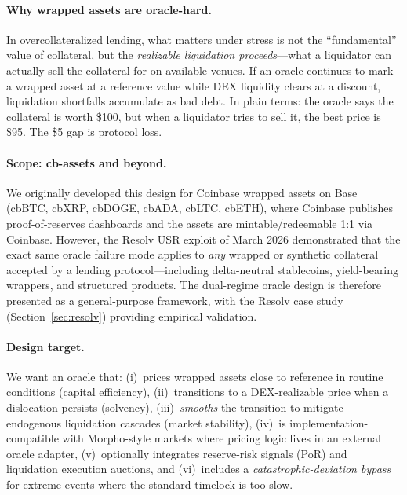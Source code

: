 \documentclass[11pt]{article}
\begin{document}
\paragraph{Why wrapped assets are oracle-hard.}
In overcollateralized lending, what matters under stress is not the ``fundamental'' value of collateral, but the \emph{realizable liquidation proceeds}---what a liquidator can actually sell the collateral for on available venues. If an oracle continues to mark a wrapped asset at a reference value while DEX liquidity clears at a discount, liquidation shortfalls accumulate as bad debt. In plain terms: the oracle says the collateral is worth \$100, but when a liquidator tries to sell it, the best price is \$95. The \$5 gap is protocol loss.

\paragraph{Scope: cb-assets and beyond.}
We originally developed this design for Coinbase wrapped assets on Base (cbBTC, cbXRP, cbDOGE, cbADA, cbLTC, cbETH), where Coinbase publishes proof-of-reserves dashboards and the assets are mintable/redeemable 1:1 via Coinbase. However, the Resolv USR exploit of March 2026 demonstrated that the exact same oracle failure mode applies to \emph{any} wrapped or synthetic collateral accepted by a lending protocol---including delta-neutral stablecoins, yield-bearing wrappers, and structured products. The dual-regime oracle design is therefore presented as a general-purpose framework, with the Resolv case study (Section~\ref{sec:resolv}) providing empirical validation.

\paragraph{Design target.}
We want an oracle that:
(i)~prices wrapped assets close to reference in routine conditions (capital efficiency),
(ii)~transitions to a DEX-realizable price when a dislocation persists (solvency),
(iii)~\emph{smooths} the transition to mitigate endogenous liquidation cascades (market stability),
(iv)~is implementation-compatible with Morpho-style markets where pricing logic lives in an external oracle adapter,
(v)~optionally integrates reserve-risk signals (PoR) and liquidation execution auctions, and
(vi)~includes a \emph{catastrophic-deviation bypass} for extreme events where the standard timelock is too slow.

\end{document}
